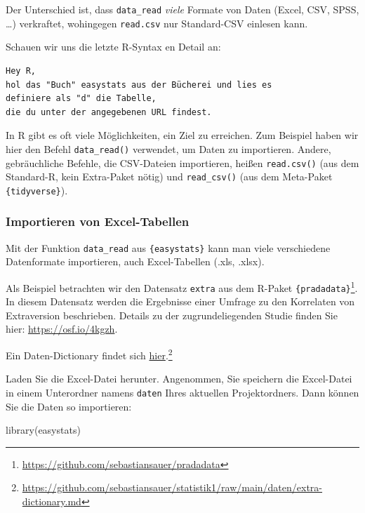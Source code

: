 \documentclass[
  letterpaper,
  DIV=11,
  numbers=noendperiod]{scrartcl}
\newenvironment{Shaded}{\begin{snugshade}}{\end{snugshade}}
\newcommand{\FunctionTok}[1]{\textcolor[rgb]{0.28,0.35,0.67}{#1}}
\newcommand{\NormalTok}[1]{\textcolor[rgb]{0.00,0.23,0.31}{#1}}
\theoremstyle{definition}
\theoremstyle{definition}
\theoremstyle{definition}
\theoremstyle{remark}
\begin{document}
Der Unterschied ist, dass \texttt{data\_read} \emph{viele} Formate von
Daten (Excel, CSV, SPSS, \ldots) verkraftet, wohingegen
\texttt{read.csv} nur Standard-CSV einlesen kann.

Schauen wir uns die letzte R-Syntax en Detail an:

\begin{verbatim}
Hey R,
hol das "Buch" easystats aus der Bücherei und lies es
definiere als "d" die Tabelle,
die du unter der angegebenen URL findest.
\end{verbatim}

In R gibt es oft viele Möglichkeiten, ein Ziel zu erreichen. Zum
Beispiel haben wir hier den Befehl \texttt{data\_read()} verwendet, um
Daten zu importieren. Andere, gebräuchliche Befehle, die CSV-Dateien
importieren, heißen \texttt{read.csv()} (aus dem Standard-R, kein
Extra-Paket nötig) und \texttt{read\_csv()} (aus dem Meta-Paket
\texttt{\{tidyverse\}}).

\subsubsection{Importieren von
Excel-Tabellen}\label{importieren-von-excel-tabellen}

Mit der Funktion \texttt{data\_read} aus \texttt{\{easystats\}} kann man
viele verschiedene Datenformate importieren, auch Excel-Tabellen (.xls,
.xlsx).

Als Beispiel betrachten wir den Datensatz \texttt{extra} aus dem R-Paket
\texttt{\{pradadata\}}\footnote{\url{https://github.com/sebastiansauer/pradadata}}.
In diesem Datensatz werden die Ergebnisse einer Umfrage zu den
Korrelaten von Extraversion beschrieben. Details zu der
zugrundeliegenden Studie finden Sie hier: \url{https://osf.io/4kgzh}.

Ein Daten-Dictionary findet sich
\href{https://github.com/sebastiansauer/statistik1/raw/main/daten/extra-dictionary.md}{hier}.\footnote{\url{https://github.com/sebastiansauer/statistik1/raw/main/daten/extra-dictionary.md}}

Laden Sie die Excel-Datei herunter. Angenommen, Sie speichern die
Excel-Datei in einem Unterordner namens \texttt{daten} Ihres aktuellen
Projektordners. Dann können Sie die Daten so importieren:

\begin{Shaded}
\begin{Highlighting}[]
\FunctionTok{library}\NormalTok{(easystats)}
\end{Highlighting}
\end{Shaded}
\end{document}
